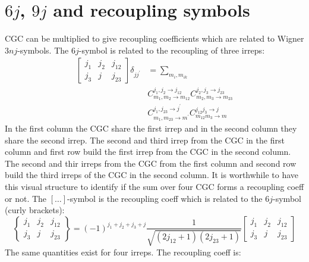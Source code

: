 \documentclass[a4paper,10pt,parskip=full]{scrartcl}
\begin{document}
\section{$6j$, $9j$ and recoupling symbols}
CGC can be multiplied to give recoupling coefficients which are related to
Wigner $3nj$-symbols. The $6j$-symbol is related to the recoupling of three irreps:
\begin{equation}
  \label{eq:recoupling-three}
  \begin{split}
  \begin{bmatrix}
    j_1 & j_2 & j_{12} \\
    j_3 & j & j_{23}
  \end{bmatrix}\delta_{jj^\prime}
  &=\sum_{m_i,m_{ik}}\\
  &C^{j_1,j_2\rightarrow j_{12}}_{m_1,m_2\rightarrow m_{12}}
  C^{j_2,j_3\rightarrow j_{23}}_{m_2,m_3\rightarrow m_{23}}\\
  &C^{j_1,j_{23}\rightarrow j^\prime}_{m_1,m_{23}\rightarrow m^\prime}
  C^{j_{12}j_3\rightarrow j}_{m_{12}m_3\rightarrow m}
  \end{split}
\end{equation}
In the first column the CGC share the first irrep and in the second column they share the second irrep.
The second and third irrep from the CGC in the first column and first row build the first irrep from the CGC
in the second column.
The second and thir irreps from the CGC from the first column and second row build the third irreps
of the CGC in the second column.
It is worthwhile to have this visual structure to identify if the sum over four CGC forms a recoupling coeff or not.
The $[\dots]$-symbol is the recoupling coeff which is related to the $6j$-symbol (curly brackets):
\begin{equation}
  \label{eq:recoupl-6j}
    \begin{Bmatrix}
    j_1 & j_2 & j_{12} \\
    j_3 & j & j_{23}
  \end{Bmatrix}
  = (-1)^{j_1+j_2+j_3+j}\frac{1}{\sqrt{(2j_{12}+1)(2j_{23}+1)}}
  \begin{bmatrix}
    j_1 & j_2 & j_{12} \\
    j_3 & j & j_{23}
  \end{bmatrix}
\end{equation}
The same quantities exist for four irreps. The recoupling coeff is:
\end{document}
